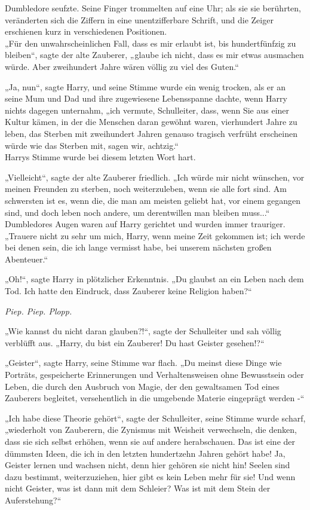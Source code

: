 {Dumbledore seufzte. Seine Finger trommelten auf eine Uhr; als sie sie berührten, veränderten sich die Ziffern in eine unentzifferbare Schrift, und die Zeiger erschienen kurz in verschiedenen Positionen.\\ „Für den unwahrscheinlichen Fall, dass es mir erlaubt ist, bis hundertfünfzig zu bleiben“, sagte der alte Zauberer, „glaube ich nicht, dass es mir etwas ausmachen würde. Aber zweihundert Jahre wären völlig zu viel des Guten.“

„Ja, nun“, sagte Harry, und seine Stimme wurde ein wenig trocken, als er an seine Mum und Dad und ihre zugewiesene Lebensspanne dachte, wenn Harry nichts dagegen unternahm, „ich vermute, Schulleiter, dass, wenn Sie aus einer Kultur kämen, in der die Menschen daran gewöhnt waren, vierhundert Jahre zu leben, das Sterben mit zweihundert Jahren genauso tragisch verfrüht erscheinen würde wie das Sterben mit, sagen wir, achtzig.“\\ Harrys Stimme wurde bei diesem letzten Wort hart.

„Vielleicht“, sagte der alte Zauberer friedlich. „Ich würde mir nicht wünschen, vor meinen Freunden zu sterben, noch weiterzuleben, wenn sie alle fort sind. Am schwersten ist es, wenn die, die man am meisten geliebt hat, vor einem gegangen sind, und doch leben noch andere, um derentwillen man bleiben muss...“\\ Dumbledores Augen waren auf Harry gerichtet und wurden immer trauriger.\\ „Trauere nicht zu sehr um mich, Harry, wenn meine Zeit gekommen ist; ich werde bei denen sein, die ich lange vermisst habe, bei unserem nächsten großen Abenteuer.“

„Oh!“, sagte Harry in plötzlicher Erkenntnis. „Du glaubst an ein Leben nach dem Tod. Ich hatte den Eindruck, dass Zauberer keine Religion haben?“

\emph{Piep. Piep. Plopp.}

„Wie kannst du nicht daran glauben?!“, sagte der Schulleiter und sah völlig verblüfft aus. „Harry, du bist ein Zauberer! Du hast Geister gesehen!?“

„Geister“, sagte Harry, seine Stimme war flach. „Du meinst diese Dinge wie Porträts, gespeicherte Erinnerungen und Verhaltensweisen ohne Bewusstsein oder Leben, die durch den Ausbruch von Magie, der den gewaltsamen Tod eines Zauberers begleitet, versehentlich in die umgebende Materie eingeprägt werden -“

„Ich habe diese Theorie gehört“, sagte der Schulleiter, seine Stimme wurde scharf, „wiederholt von Zauberern, die Zynismus mit Weisheit verwechseln, die denken, dass sie sich selbst erhöhen, wenn sie auf andere herabschauen. Das ist eine der dümmsten Ideen, die ich in den letzten hundertzehn Jahren gehört habe! Ja, Geister lernen und wachsen nicht, denn hier gehören sie nicht hin! Seelen sind dazu bestimmt, weiterzuziehen, hier gibt es kein Leben mehr für sie! Und wenn nicht Geister, was ist dann mit dem Schleier? Was ist mit dem Stein der Auferstehung?“

}
